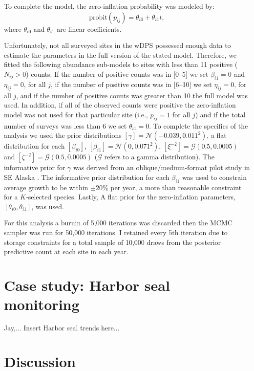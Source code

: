 \documentclass[12pt,letter]{article}
\newcommand{\Nij}{\ensuremath{N_{ij}}}
\begin{document}
To complete the model, the zero-inflation probability was modeled by:
\begin{equation}
\mbox{probit}(p_{ij}) = \theta_{i0} + \theta_{i1}t ,
\end{equation}
where $\theta_{i0}$ and $\theta_{i1}$ are linear coefficients. 

Unfortunately, not all surveyed sites in the wDPS possessed enough data to estimate the parameters in the full version of the stated model. Therefore, we fitted the following abundance sub-models to sites with less than 11 positive ($\Nij>0$) counts. If the number of positive counts was in [0--5] we set $\beta_{i1}=0$ and $\eta_{ij}=0$, for all $j$, if the number of positive counts was in [6--10] we set $\eta_{ij}=0$, for all $j$, and if the number of positive counts was greater than 10 the full model was used. In addition, if all of the observed counts were positive the zero-inflation model was not used for that particular site (i.e., $p_{ij}=1$ for all $j$) and if the total number of surveys was less than 6 we set $\theta_{i1}=0$. To complete the specifics of the analysis we used the prior distributions $[\gamma]=\mathcal{N}(-0.039, 0.011^2)$, a flat distribution for each $[\beta_{i0}]$, $[\beta_{i1}] = \mathcal{N}(0,0.071^2)$, $[\xi^{-2}]=\mathcal{G}(0.5,0.0005)$ and $[\zeta^{-2}]=\mathcal{G}(0.5,0.0005)$ ($\mathcal{G}$ refers to a gamma distribution). The informative prior for $\gamma$ was derived from an oblique/medium-format pilot study in SE Alaska \citep{}. The informative prior distribution for each $\beta_{i1}$ was used to constrain average growth to be within $\pm20$\% per year, a more than reasonable constraint for a $K$-selected species. Lastly, A flat prior for the zero-inflation parameters, $[\theta_{i0},\theta_{i1}]$, was used. 

For this analysis a burnin of 5,000 iterations was discarded then the MCMC sampler was run for 50,000 iterations. I retained every 5th iteration due to storage constraints for a total sample of 10,000 draws from the posterior predictive count at each site in each year. 




\section{Case study: Harbor seal monitoring}

Jay,... Insert Harbor seal trends here...




\section{Discussion}
\end{document}
